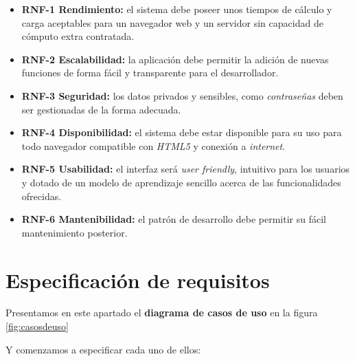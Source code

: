 \begin{itemize}
    \item \textbf{RNF-1 Rendimiento:} el sistema debe poseer unos tiempos de cálculo y carga aceptables para un navegador web y un servidor sin capacidad de cómputo extra contratada.
    \item \textbf{RNF-2 Escalabilidad:} la aplicación debe permitir la adición de nuevas funciones de forma fácil y transparente para el desarrollador.
    \item \textbf{RNF-3 Seguridad:} los datos privados y sensibles, como \textit{contraseñas} deben ser gestionadas de la forma adecuada.
    \item \textbf{RNF-4 Disponibilidad:} el sistema debe estar disponible para su uso para todo navegador compatible con \textit{HTML5} y conexión a \textit{internet}.
    \item \textbf{RNF-5 Usabilidad:} el interfaz será \textit{user friendly}, intuitivo para los usuarios y dotado de un modelo de aprendizaje sencillo acerca de las funcionalidades ofrecidas.
    \item \textbf{RNF-6 Mantenibilidad:} el patrón de desarrollo debe permitir su fácil mantenimiento posterior.
\end{itemize}


\section{Especificación de requisitos}

Presentamos en este apartado el \textbf{diagrama de casos de uso} en la figura \ref{fig:casosdeuso}


Y comenzamos a especificar cada uno de ellos:

